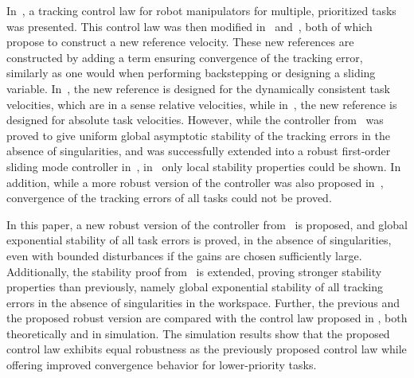 \documentclass[../main.tex]{subfiles}
\begin{document}

In~\cite{Dietrich2020}, a tracking control law for robot manipulators for multiple, prioritized tasks was presented. This control law was then modified in~\cite{Garofalo2020} and~\cite{Saeboe2022}, both of which propose to construct a new reference velocity. These new references are constructed by adding a term ensuring convergence of the tracking error, similarly as one would when performing backstepping or designing a sliding variable. In~\cite{Garofalo2020}, the new reference is designed for the dynamically consistent task velocities, which are in a sense relative velocities, while in~\cite{Saeboe2022}, the new reference is designed for absolute task velocities. However, while the controller from~\cite{Garofalo2020} was proved to give uniform global asymptotic stability of the tracking errors in the absence of singularities, and was successfully extended into a robust first-order sliding mode controller in~\cite{DyrhaugTveter2023}, in~\cite{Saeboe2022} only local stability properties could be shown. In addition, while a more robust version of the controller was also proposed in~\cite{Saeboe2022}, convergence of the tracking errors of all tasks could not be proved.

In this paper, a new robust version of the controller from~\cite{Saeboe2022} is proposed, and global exponential stability of all task errors is proved, in the absence of singularities, even with bounded disturbances if the gains are chosen sufficiently large. Additionally, the stability proof from~\cite{Saeboe2022} is extended, proving stronger stability properties than previously, namely global exponential stability of all tracking errors in the absence of singularities in the workspace. Further, the previous and the proposed robust version are compared with the control law proposed in \cite{Garofalo2020}, both theoretically and in simulation. 
The simulation results show that the proposed control law exhibits equal robustness as the previously proposed control law while offering improved convergence behavior for lower-priority tasks. 
\end{document}
